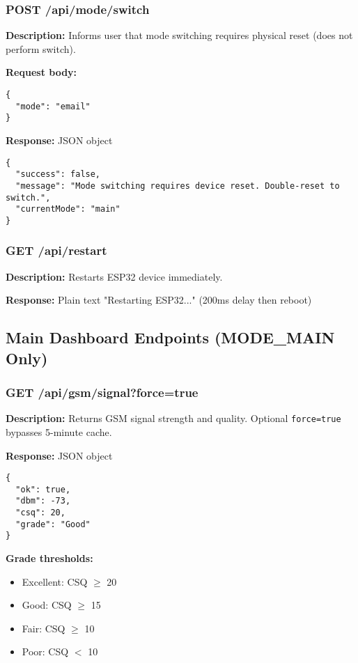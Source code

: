 \documentclass[11pt,a4paper]{article}
\begin{document}
\subsubsection{POST /api/mode/switch}
\textbf{Description:} Informs user that mode switching requires physical reset (does not perform switch).

\textbf{Request body:}
\begin{verbatim}
{
  "mode": "email"
}
\end{verbatim}

\textbf{Response:} JSON object
\begin{verbatim}
{
  "success": false,
  "message": "Mode switching requires device reset. Double-reset to switch.",
  "currentMode": "main"
}
\end{verbatim}

\subsubsection{GET /api/restart}
\textbf{Description:} Restarts ESP32 device immediately.

\textbf{Response:} Plain text "Restarting ESP32..." (200ms delay then reboot)

\subsection{Main Dashboard Endpoints (MODE\_MAIN Only)}

\subsubsection{GET /api/gsm/signal?force=true}
\textbf{Description:} Returns GSM signal strength and quality. Optional \texttt{force=true} bypasses 5-minute cache.

\textbf{Response:} JSON object
\begin{verbatim}
{
  "ok": true,
  "dbm": -73,
  "csq": 20,
  "grade": "Good"
}
\end{verbatim}

\textbf{Grade thresholds:}
\begin{itemize}[leftmargin=*]
  \item Excellent: CSQ $\geq$ 20
  \item Good: CSQ $\geq$ 15
  \item Fair: CSQ $\geq$ 10
  \item Poor: CSQ $<$ 10
\end{itemize}
\end{document}

